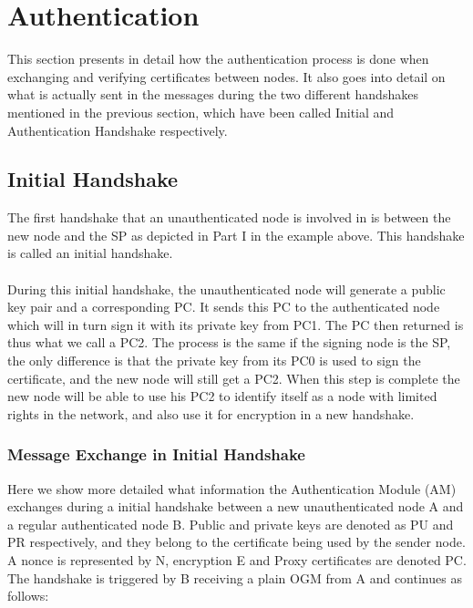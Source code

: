 \section{Authentication} \label{system_authentication}
This section presents in detail how the authentication process is done when exchanging and verifying certificates between nodes. It also goes into detail on what is actually sent in the messages during the two different handshakes mentioned in the previous section, which have been called Initial and Authentication Handshake respectively.

\subsection{Initial Handshake}
The first handshake that an unauthenticated node is involved in is between the new node and the SP as depicted in Part I in the example above. This handshake is called an initial handshake.
\\\\
During this initial handshake, the unauthenticated node will generate a public key pair and a corresponding PC. It sends this PC to the authenticated node which will in turn sign it with its private key from PC1. The PC then returned is thus what we call a PC2. The process is the same if the signing node is the SP, the only difference is that the private key from its PC0 is used to sign the certificate, and the new node will still get a PC2. When this step is complete the new node will be able to use his PC2 to identify itself as a node with limited rights in the network, and also use it for encryption in a new handshake.


\subsubsection*{Message Exchange in Initial Handshake}
Here we show more detailed what information the Authentication Module (AM) exchanges during a initial handshake between a new unauthenticated node A and a regular authenticated node B. Public and private keys are denoted as PU and PR respectively, and they belong to the certificate being used by the sender node. A nonce is represented by N, encryption E and Proxy certificates are denoted PC. The handshake is triggered by B receiving a plain OGM from A and continues as follows:

